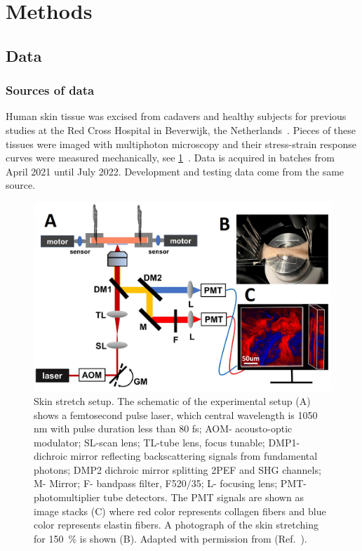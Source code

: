 \section{Methods}

\subsection{Data}

\subsubsection{Sources of data}

Human skin tissue was excised from cadavers and healthy subjects for previous studies at the Red Cross Hospital in Beverwijk, the Netherlands~.
Pieces of these tissues were imaged with multiphoton microscopy and their stress-strain response curves were measured mechanically, see \cref{fig:lab-setup}~.
Data is acquired in batches from April 2021 until July 2022.
Development and testing data come from the same source.

\begin{figure}
    \centering
    \includegraphics[width=\linewidth]{skinstression/images/measuring-setup.png}
    \caption[Skin stretch setup]{
        Skin stretch setup.
        The schematic of the experimental setup (A) shows a femtosecond pulse laser, which central wavelength is 1050 nm with pulse duration less than 80 fs; AOM- acousto-optic modulator; SL-scan lens; TL-tube lens, focus tunable; DMP1-dichroic mirror reflecting backscattering signals from fundamental photons; DMP2 dichroic mirror splitting 2PEF and SHG channels; M- Mirror; F- bandpass filter, F520/35; L- focusing lens; PMT-photomultiplier tube detectors. 
        The PMT signals are shown as image stacks (C) where red color represents collagen fibers and blue color represents elastin fibers.
        A photograph of the skin stretching for \qty{150}{\percent} is shown (B).
        Adapted with permission from  (Ref.~\cite{Zhou2023}).
    }
    \label{fig:lab-setup}
\end{figure}


